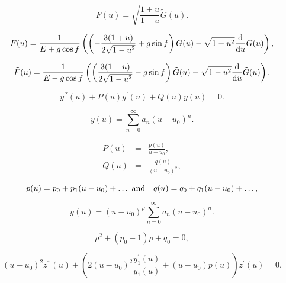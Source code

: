 \documentclass[]{article}
\begin{document}
\begin{equation}
	\label{FGtilde} 
	F(u) = \sqrt{\frac{1+u}{1-u}}{\tilde G}(u).
\end{equation}

\begin{equation}
	\label{F}
	F(u) = \frac{1}{E + g \cos f}\left(
	\left(
	-\frac{3 (1 + u)}{2 \sqrt{1-u^2}} + g \sin f
	\right) G(u) 
	- \sqrt{1 - u^2} \frac{{\rm d}}{{\rm d}u} G(u)
	\right),
\end{equation}

\begin{equation}
	\label{tildeF}
	{\tilde F}(u) = \frac{1}{E - g \cos f}\left(
	\left(
	\frac{3(1 - u)}{2 \sqrt{1-u^2}} - g \sin f
	\right) {\tilde G}(u) 
	- \sqrt{1 - u^2} \frac{{\rm d}}{{\rm d}u} {\tilde G}(u)
	\right).
\end{equation}

\begin{equation}
	\label{diffeq}
	y^{\prime \prime}(u) + P(u) y^\prime(u) + Q(u) y(u) = 0.
\end{equation}

\begin{equation}
	y(u) = \sum\limits_{n=0}^\infty a_n (u-u_0)^n.
\end{equation}

\begin{eqnarray}
	P(u) &=& \frac{p(u)}{u-u_0}, \\
	Q(u) &=& \frac{q(u)}{(u-u_0)^2},
\end{eqnarray}

\begin{equation}
	p(u) = p_0 + p_1 (u-u_0) + \dots\ {\rm and}~~~
	q(u) = q_0 + q_1 (u-u_0) + \dots,
\end{equation}

\begin{equation}
	\label{eqansatz}
	y(u) = (u-u_0)^\rho \sum\limits_{n=0}^\infty a_n (u-u_0)^n.
\end{equation}

\begin{equation}
	\label{indicial}
	\rho^2 + (p_0 - 1) \rho + q_0 = 0,
\end{equation}

\begin{equation}
	\label{difeqz}
	(u-u_0)^2 z^{\prime \prime}(u) + \left(
	2 (u-u_0)^2 \frac{y_1^\prime(u)}{y_1(u)} + (u-u_0) p(u) 
	\right) z^\prime(u) = 0.
\end{equation}
\end{document}
